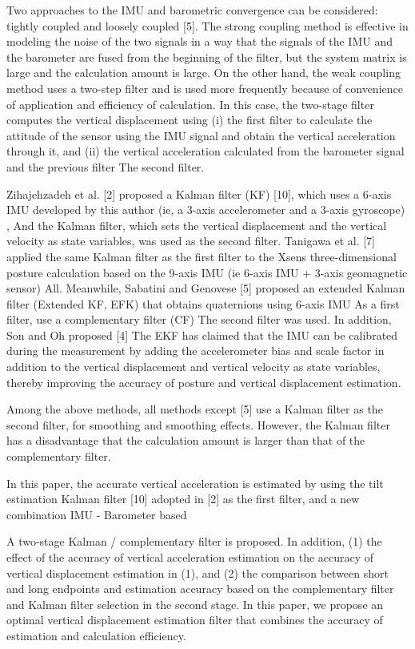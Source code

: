 \documentclass[10pt,journal,compsoc]{IEEEtran}
\begin{document}
Two approaches to the IMU and barometric convergence can be considered: tightly
coupled and loosely coupled [5]. The strong coupling method is effective in
modeling the noise of the two signals in a way that the signals of the IMU and
the barometer are fused from the beginning of the filter, but the system matrix
is ​​large and the calculation amount is large. On the other hand,
the weak coupling method uses a two-step filter and is used more frequently
because of convenience of application and efficiency of calculation. In this
case, the two-stage filter computes the vertical displacement using (i) the
first filter to calculate the attitude of the sensor using the IMU signal and
obtain the vertical acceleration through it, and (ii) the vertical acceleration
calculated from the barometer signal and the previous filter The second filter. 


Zihajehzadeh et al. [2] proposed a Kalman filter (KF) [10], which uses a 6-axis
IMU developed by this author (ie, a 3-axis accelerometer and a 3-axis
gyroscope) , And the Kalman filter, which sets the vertical displacement and
the vertical velocity as state variables, was used as the second filter.
Tanigawa et al. [7] applied the same Kalman filter as the first filter to the
Xsens three-dimensional posture calculation based on the 9-axis IMU (ie 6-axis
IMU + 3-axis geomagnetic sensor) All. Meanwhile, Sabatini and Genovese [5]
proposed an extended Kalman filter (Extended KF, EFK) that obtains quaternions
using 6-axis IMU As a first filter, use a complementary filter (CF) The second
filter was used. In addition, Son and Oh proposed [4] The EKF has claimed that
the IMU can be calibrated during the measurement by adding the accelerometer
bias and scale factor in addition to the vertical displacement and vertical
velocity as state variables, thereby improving the accuracy of posture and
vertical displacement estimation.

Among the above methods, all methods except [5] use a Kalman filter as the second filter,
for smoothing and smoothing effects.  However, the Kalman filter has a
disadvantage that the calculation amount is larger than that of the
complementary filter.

In this paper, the accurate vertical acceleration is estimated by using the
tilt estimation Kalman filter [10] adopted in [2] as the first filter, and a
new combination IMU - Barometer based

A two-stage Kalman / complementary filter is proposed. In addition, (1) the
effect of the accuracy of vertical acceleration estimation on the accuracy of
vertical displacement estimation in (1), and (2) the comparison between short
and long endpoints and estimation accuracy based on the complementary filter
and Kalman filter selection in the second stage. In this paper, we propose an
optimal vertical displacement estimation filter that combines the accuracy of
estimation and calculation efficiency.
\end{document}
